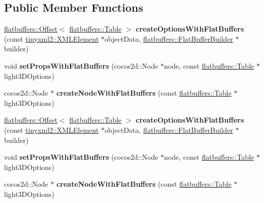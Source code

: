 \subsection*{Public Member Functions}
\begin{DoxyCompactItemize}
\item 
\mbox{\label{classcocostudio_1_1Light3DReader_a708a9e60e9a510df2cb4e672a5ab6858}} 
\hyperlink{structflatbuffers_1_1Offset}{flatbuffers\+::\+Offset}$<$ \hyperlink{classflatbuffers_1_1Table}{flatbuffers\+::\+Table} $>$ {\bfseries create\+Options\+With\+Flat\+Buffers} (const \hyperlink{classtinyxml2_1_1XMLElement}{tinyxml2\+::\+X\+M\+L\+Element} $\ast$object\+Data, \hyperlink{classflatbuffers_1_1FlatBufferBuilder}{flatbuffers\+::\+Flat\+Buffer\+Builder} $\ast$builder)
\item 
\mbox{\label{classcocostudio_1_1Light3DReader_a2a3731586d07656b4b28f2c0b035b8f9}} 
void {\bfseries set\+Props\+With\+Flat\+Buffers} (cocos2d\+::\+Node $\ast$node, const \hyperlink{classflatbuffers_1_1Table}{flatbuffers\+::\+Table} $\ast$light3\+D\+Options)
\item 
\mbox{\label{classcocostudio_1_1Light3DReader_a75e9ce39e28209e32ed9930a138f42be}} 
cocos2d\+::\+Node $\ast$ {\bfseries create\+Node\+With\+Flat\+Buffers} (const \hyperlink{classflatbuffers_1_1Table}{flatbuffers\+::\+Table} $\ast$light3\+D\+Options)
\item 
\mbox{\label{classcocostudio_1_1Light3DReader_a99970f0594271c6b5ef57ab46725a04f}} 
\hyperlink{structflatbuffers_1_1Offset}{flatbuffers\+::\+Offset}$<$ \hyperlink{classflatbuffers_1_1Table}{flatbuffers\+::\+Table} $>$ {\bfseries create\+Options\+With\+Flat\+Buffers} (const \hyperlink{classtinyxml2_1_1XMLElement}{tinyxml2\+::\+X\+M\+L\+Element} $\ast$object\+Data, \hyperlink{classflatbuffers_1_1FlatBufferBuilder}{flatbuffers\+::\+Flat\+Buffer\+Builder} $\ast$builder)
\item 
\mbox{\label{classcocostudio_1_1Light3DReader_a2a3731586d07656b4b28f2c0b035b8f9}} 
void {\bfseries set\+Props\+With\+Flat\+Buffers} (cocos2d\+::\+Node $\ast$node, const \hyperlink{classflatbuffers_1_1Table}{flatbuffers\+::\+Table} $\ast$light3\+D\+Options)
\item 
\mbox{\label{classcocostudio_1_1Light3DReader_abecf5f20b2d93df2b4710baed879e04c}} 
cocos2d\+::\+Node $\ast$ {\bfseries create\+Node\+With\+Flat\+Buffers} (const \hyperlink{classflatbuffers_1_1Table}{flatbuffers\+::\+Table} $\ast$light3\+D\+Options)
\end{DoxyCompactItemize}
